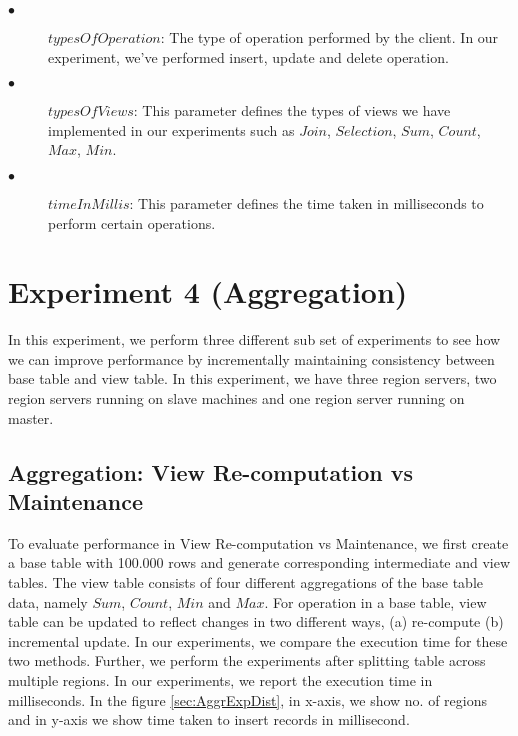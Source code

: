 \documentclass[11pt,a4paper,bibtotoc,idxtotoc,headsepline,footsepline,footexclude,BCOR12mm,DIV13]{scrbook}
\begin{document}
\begin{description}
	\item[$\bullet$]  $typesOfOperation$: The type of operation performed by the client. In our experiment, we've performed insert, update and delete operation. 
\end{description}

\begin{description}
	\item[$\bullet$]  $typesOfViews$: This parameter defines the types of views we have implemented in our experiments such as $Join$, $Selection$, $Sum$, $Count$, $Max$, $Min$. 
\end{description}

\begin{description}
	\item[$\bullet$]  $timeInMillis$: This parameter defines the time taken in milliseconds to perform certain operations. 
\end{description}

\section{Experiment 4 (Aggregation)}
\label{(sec:AggrExpDist)}
In this experiment, we perform three different sub set of experiments to see how we can improve performance by incrementally maintaining consistency between base table and view table. In this experiment, we have three region servers, two region servers running on slave machines and one region server running on master. 

\subsection{Aggregation: View Re-computation vs Maintenance}
To evaluate performance in View Re-computation vs Maintenance, we first create a base table with 100.000 rows and generate corresponding intermediate and view tables. The view table consists of four different aggregations of the base table data, namely $Sum$, $Count$, $Min$ and $Max$. For operation in a base table, view table can be updated to reflect changes in two different ways, (a) re-compute (b) incremental update. In our experiments, we compare the execution time for these two methods. Further, we perform the experiments after splitting table across multiple regions. In our experiments, we report the execution time in milliseconds. In the figure \ref{sec:AggrExpDist}, in x-axis, we show no. of regions and in y-axis we show time taken to insert records in millisecond. 
\end{document}
